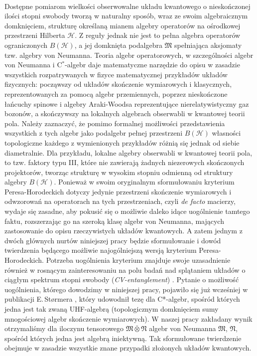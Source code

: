 \paragraph{}
\label{par:intro:02}
Dostępne pomiarom wielkości obserwowalne układu kwantowego o nieskończonej
ilości stopni swobody tworzą w naturalny sposób,
wraz ze swoim algebraicznym domknięciem,
strukturę określaną mianem algebry operatorów na ośrodkowej przestrzeni Hilberta
$\mathcal{H}$.
Z reguły jednak nie jest to pełna algebra operatorów ograniczonych
$B(\mathcal{H})$,
a jej domknięta podalgebra $\mathfrak{M}$ spełniająca aksjomaty tzw.
algebry von Neumanna.
Teoria algebr operatorowych,
w szczególności algebr von Neumanna i \mbox{C$^{*}$-algebr}
daje matematyczne narzędzie do opisu w zasadzie wszystkich rozpatrywanych
w fizyce matematycznej przykładów układów fizycznych:
począwszy od układów skończenie wymiarowych i klasycznych,
reprezentowanych za pomocą algebr przemiennych,
poprzez nieskończone łańcuchy spinowe i algebry Araki-Woodsa reprezentujące
nierelatywistyczny gaz bozonów,
a skończywszy na lokalnych algebrach obserwabli w kwantowej teorii pola.
Należy zaznaczyć,
że pomimo formalnej możliwości przedstawienia wszystkich z tych algebr jako
podalgebr pełnej przestrzeni $B(\mathcal{H})$
własności topologiczne każdego z wymienionych przykładów
różnią się jednak od siebie diametralnie.
Dla przykładu, lokalne algebry obserwabli w kwantowej teorii pola,
to tzw. faktory typu III,
które nie zawierają żadnych niezerowych skończonych projektorów,
tworząc strukturę w wysokim stopniu odmienną od struktury algebry $B(\mathcal{H})$. 
Ponieważ w swoim oryginalnym sformułowaniu kryterium Peresa-Horodeckich
dotyczy jedynie przestrzeni skończenie wymiarowych i odwzorowań na operatorach
na tych przestrzeniach,
czyli \emph{de facto} macierzy,
wydaje się zasadne,
aby pokusić się o możliwie daleko idące uogólnienie tamtego faktu,
rozszerzając go na szeroką klasę algebr von Neumanna,
mających zastosowanie do opisu rzeczywistych układów kwantowych.
A zatem jednym z dwóch głównych nurtów niniejszej pracy będzie sformułowanie
i dowód twierdzenia będącego możliwie najogólniejszą wersją
kryterium Peresa-Horodeckich.
Potrzeba uogólnienia kryterium znajduje swoje uzasadnienie również 
w rosnącym zainteresowaniu na polu badań nad splątaniem układów o ciągłym
spektrum stopni swobody (\emph{CV-entanglement})
\cite{adesso2007entanglement}.
Pytanie o możliwość uogólnienia, którego dowodzimy w niniejszej pracy,
pojawiło się już wcześniej w publikacji E.\,St{\o}rmera
\cite{stormer2008separable},
który udowodnił tezę dla C*-algebr,
spośród których jedna jest tak zwaną UHF-algebrą 
(topologicznym domknięciem sumy mnogościowej algebr skończenie wymiarowych).
W naszej pracy zakładany wynik otrzymaliśmy dla iloczynu tensorowego
$\mathfrak{M} \bar{\otimes} \mathfrak{N}$ 
algebr von Neumanna $\mathfrak{M}$, $\mathfrak{N}$,
spośród których jedna jest algebrą iniektywną.
Tak sformułowane twierdzenie obejmuje w zasadzie wszystkie znane
przypadki złożonych układów kwantowych.

